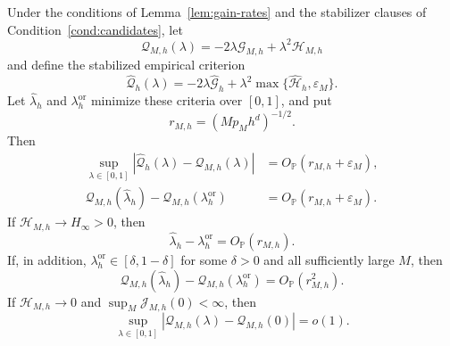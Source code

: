\begin{lemma}
\label{lem:regret}
Under the conditions of Lemma~\ref{lem:gain-rates} and the stabilizer clauses
of Condition~\ref{cond:candidates}, let
\[
\mathcal Q_{M,h}(\lambda)
=-2\lambda\mathcal G_{M,h}+\lambda^2\mathcal H_{M,h}
\]
and define the stabilized empirical criterion
\[
\widehat{\mathcal Q}_{h}(\lambda)
=
-2\lambda\widehat{\mathcal G}_{h}
+
\lambda^2\max\{\widehat{\mathcal H}_{h},\varepsilon_M\}.
\]
Let \(\widehat\lambda_h\) and \(\lambda_h^{\mathrm{or}}\) minimize these criteria over \([0,1]\), and put
\[
r_{M,h}=(Mp_Mh^d)^{-1/2}.
\]
Then
\begin{align}
\sup_{\lambda\in[0,1]}
|\widehat{\mathcal Q}_{h}(\lambda)-\mathcal Q_{M,h}(\lambda)|
&=O_{\mathbb P}(r_{M,h}+\varepsilon_M),
\label{eq:Q-uniform}\\
\mathcal Q_{M,h}(\widehat\lambda_h)
-
\mathcal Q_{M,h}(\lambda_h^{\mathrm{or}})
&=O_{\mathbb P}(r_{M,h}+\varepsilon_M).
\label{eq:Q-regret}
\end{align}
If \(\mathcal H_{M,h}\to H_\infty>0\), then
\begin{equation}
\widehat\lambda_h-\lambda_h^{\mathrm{or}}
=O_{\mathbb P}(r_{M,h}).
\label{eq:lambda-direct-rate}
\end{equation}
If, in addition, \(\lambda_h^{\mathrm{or}}\in[\delta,1-\delta]\) for some \(\delta>0\) and all sufficiently large \(M\), then
\begin{equation}
\mathcal Q_{M,h}(\widehat\lambda_h)
-
\mathcal Q_{M,h}(\lambda_h^{\mathrm{or}})
=O_{\mathbb P}(r_{M,h}^2).
\label{eq:Q-interior-regret}
\end{equation}
If \(\mathcal H_{M,h}\to0\) and \(\sup_M\mathcal J_{M,h}(0)<\infty\), then
\begin{equation}
\sup_{\lambda\in[0,1]}
|\mathcal Q_{M,h}(\lambda)-\mathcal Q_{M,h}(0)|
=o(1).
\label{eq:flat-criterion}
\end{equation}
\end{lemma}

